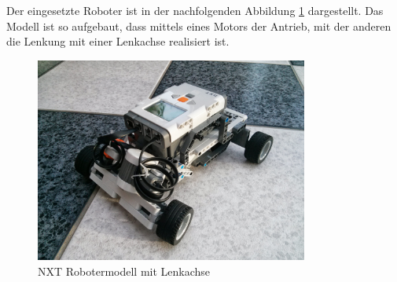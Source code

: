 \par\smallskip    
Der eingesetzte Roboter ist in der nachfolgenden Abbildung \ref{fig:nxt} dargestellt. Das Modell ist so aufgebaut, dass mittels eines Motors der Antrieb, mit der anderen die Lenkung mit einer Lenkachse realisiert ist.

\begin{figure}[H]
\includegraphics[width=0.8\textwidth]{img/nxt/IMG_20130603_065536.jpg}
\caption[NXT]{NXT Robotermodell mit Lenkachse}
\label{fig:nxt}
\end{figure}
\clearpage